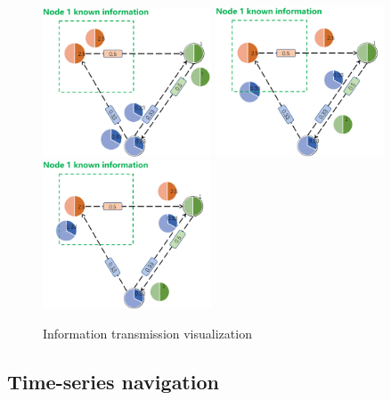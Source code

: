 \documentclass[conference]{IEEEtran}
\begin{document}
\begin{figure}[ht]
    \centering
    \includegraphics[width=5cm]{PPT1.png}
    \includegraphics[width=5cm]{PPT2.png}
    \includegraphics[width=5cm]{PPT3.png}
    \caption{Information transmission visualization}
\label{fig:PPT}
\end{figure}

\subsection{Time-series navigation}

\end{document}
